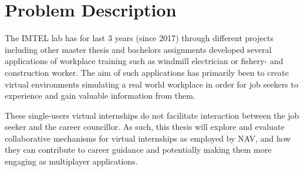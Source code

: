 \section{Problem Description}
The IMTEL lab has for last 3 years (since 2017) through different projects including other master thesis and bachelors assignments developed several applications of workplace training such as windmill electrician \cite{henrichsen2019engaging} or fishery- and construction worker. The aim of such applications has primarily been to create virtual environments simulating a real world workplace in order for job seekers to experience and gain valuable information from them.

These single-users virtual internships do not facilitate interaction between the job seeker and the career councillor. 
As such, this thesis will explore and evaluate collaborative mechanisms for virtual internships as employed by NAV, and how they can contribute to career guidance and potentially making them more engaging as multiplayer applications.


\clearpage

